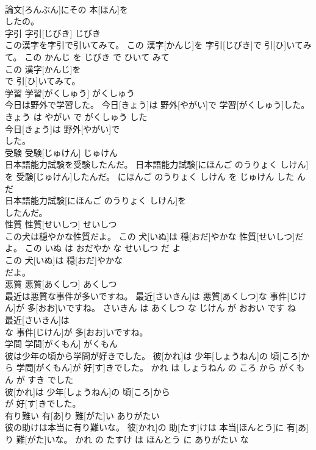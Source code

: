 \documentclass[8pt]{extreport}
\begin{document}
\begin{CJK}{UTF8}{min}
\\	論文[ろんぶん]にその 本[ほん]を
\\	したの。			
\\	字引	字引[じびき]	じびき	
\\	この漢字を字引で引いてみて。	この 漢字[かんじ]を 字引[じびき]で 引[ひ]いてみて。	この かんじ を じびき で ひいて みて	
\\	この 漢字[かんじ]を
\\	で 引[ひ]いてみて。			
\\	学習	学習[がくしゅう]	がくしゅう	
\\	今日は野外で学習した。	今日[きょう]は 野外[やがい]で 学習[がくしゅう]した。	きょう は やがい で がくしゅう した	
\\	今日[きょう]は 野外[やがい]で
\\	した。			
\\	受験	受験[じゅけん]	じゅけん	
\\	日本語能力試験を受験したんだ。	日本語能力試験[にほんご のうりょく しけん]を 受験[じゅけん]したんだ。	にほんご のうりょく しけん を じゅけん した ん だ	
\\	日本語能力試験[にほんご のうりょく しけん]を
\\	したんだ。			
\\	性質	性質[せいしつ]	せいしつ	
\\	この犬は穏やかな性質だよ。	この 犬[いぬ]は 穏[おだ]やかな 性質[せいしつ]だよ。	この いぬ は おだやか な せいしつ だ よ	
\\	この 犬[いぬ]は 穏[おだ]やかな
\\	だよ。			
\\	悪質	悪質[あくしつ]	あくしつ	
\\	最近は悪質な事件が多いですね。	最近[さいきん]は 悪質[あくしつ]な 事件[じけん]が 多[おお]いですね。	さいきん は あくしつ な じけん が おおい です ね	
\\	最近[さいきん]は
\\	な 事件[じけん]が 多[おお]いですね。			
\\	学問	学問[がくもん]	がくもん	
\\	彼は少年の頃から学問が好きでした。	彼[かれ]は 少年[しょうねん]の 頃[ころ]から 学問[がくもん]が 好[す]きでした。	かれ は しょうねん の ころ から がくもん が すき でした	
\\	彼[かれ]は 少年[しょうねん]の 頃[ころ]から
\\	が 好[す]きでした。			
\\	有り難い	有[あ]り 難[がた]い	ありがたい	
\\	彼の助けは本当に有り難いな。	彼[かれ]の 助[たす]けは 本当[ほんとう]に 有[あ]り 難[がた]いな。	かれ の たすけ は ほんとう に ありがたい な	

\end{CJK}
\end{document}
